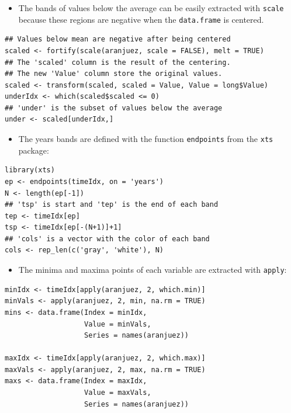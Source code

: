 \begin{itemize}
\item The bands of values below the average can be easily extracted with
\texttt{scale} because these regions are negative when the \texttt{data.frame} is
centered.
\end{itemize}
\lstset{language=r,label= ,caption= ,captionpos=b,numbers=none}
\begin{lstlisting}
## Values below mean are negative after being centered
scaled <- fortify(scale(aranjuez, scale = FALSE), melt = TRUE)
## The 'scaled' column is the result of the centering.
## The new 'Value' column store the original values.
scaled <- transform(scaled, scaled = Value, Value = long$Value)
underIdx <- which(scaled$scaled <= 0)
## 'under' is the subset of values below the average
under <- scaled[underIdx,]
\end{lstlisting}

\begin{itemize}
\item The years bands are defined with the function \texttt{endpoints} from the
\texttt{xts} package:
\end{itemize}


\lstset{language=r,label= ,caption= ,captionpos=b,numbers=none}
\begin{lstlisting}
library(xts)
ep <- endpoints(timeIdx, on = 'years')
N <- length(ep[-1])
## 'tsp' is start and 'tep' is the end of each band
tep <- timeIdx[ep]
tsp <- timeIdx[ep[-(N+1)]+1]
## 'cols' is a vector with the color of each band
cols <- rep_len(c('gray', 'white'), N)
\end{lstlisting}
\begin{itemize}
\item The minima and maxima points of each variable are extracted with
\texttt{apply}:
\end{itemize}
\lstset{language=r,label= ,caption= ,captionpos=b,numbers=none}
\begin{lstlisting}
minIdx <- timeIdx[apply(aranjuez, 2, which.min)]
minVals <- apply(aranjuez, 2, min, na.rm = TRUE)
mins <- data.frame(Index = minIdx,
                   Value = minVals,
                   Series = names(aranjuez))

maxIdx <- timeIdx[apply(aranjuez, 2, which.max)]
maxVals <- apply(aranjuez, 2, max, na.rm = TRUE)
maxs <- data.frame(Index = maxIdx,
                   Value = maxVals,
                   Series = names(aranjuez))
\end{lstlisting}

